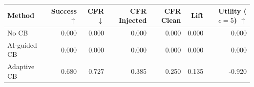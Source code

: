 \begin{tabular}{lrrrrrr}
\toprule
Method & Success $\uparrow$ & CFR $\downarrow$ & CFR Injected & CFR Clean & Lift & Utility ($c=5$) $\uparrow$ \\
\midrule
No CB & 0.000 & 0.000 & 0.000 & 0.000 & 0.000 & 0.000 \\
AI-guided CB & 0.000 & 0.000 & 0.000 & 0.000 & 0.000 & 0.000 \\
Adaptive CB & 0.680 & 0.727 & 0.385 & 0.250 & 0.135 & -0.920 \\
\bottomrule
\end{tabular}
